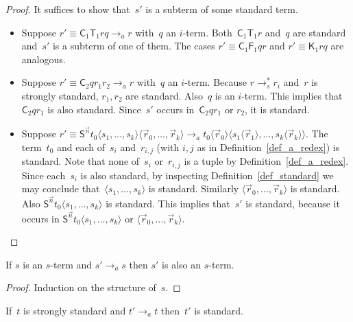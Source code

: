 \documentclass[a4paper,UKenglish]{lipics-v2016}
\newcommand{\Cs}{\mathsf{C}}
\newcommand{\Fs}{\mathsf{F}}
\newcommand{\Ts}{\mathsf{T}}
\newcommand{\Ss}{\mathsf{S}}
\newcommand{\Ks}{\mathsf{K}}
\newcommand{\la}{\ensuremath{\langle}}
\newcommand{\ra}{\ensuremath{\rangle}}
\begin{document}
\begin{proof}
  It suffices to show that~$s'$ is a subterm of some standard term.
  \begin{itemize}
  \item Suppose $r' \equiv \Cs_1 \Ts_1 r q \to_a r$ with~$q$ an
    $i$-term. Both~$\Cs_1 \Ts_1 r$ and~$q$ are standard and~$s'$ is a
    subterm of one of them. The cases $r' \equiv \Cs_1 \Fs_1 q r$ and
    $r' \equiv \Ks_1 r q$ are analogous.
  \item Suppose $r' \equiv \Cs_2 q r_1 r_2 \to_a r$ with~$q$ an
    $i$-term. Because $r \to_s^{*} r_i$ and~$r$ is strongly standard,
    $r_1,r_2$ are standard. Also~$q$ is an $i$-term. This implies that
    $\Cs_2 q r_1$ is also standard. Since~$s'$ occurs in~$\Cs_2 q r_1$ or
    $r_2$, it is standard.
  \item Suppose
    $r' \equiv \Ss^{\vec{n}} t_0 \la s_1,\ldots,s_k \ra \la
    \vec{r}_0,\ldots,\vec{r}_k \ra \to_a t_0 \la \vec{r}_0 \ra \la
    s_1 \la \vec{r}_1 \ra, \ldots, s_k \la \vec{r}_k \ra \ra$. The
    term~$t_0$ and each of~$s_i$ and~$r_{i,j}$ (with $i,j$ as in
    Definition~\ref{def_a_redex}) is standard. Note that none of~$s_i$
    or~$r_{i,j}$ is a tuple by Definition~\ref{def_a_redex}. Since
    each~$s_i$ is also standard, by inspecting
    Definition~\ref{def_standard} we may conclude
    that~$\la s_1,\ldots,s_k\ra$ is standard. Similarly
    $\la \vec{r}_0,\ldots,\vec{r}_k \ra$ is standard. Also
    $\Ss^{\vec{n}} t_0 \la s_1,\ldots,s_k \ra$ is standard. This
    implies that~$s'$ is standard, because it occurs in
    $\Ss^{\vec{n}} t_0 \la s_1,\ldots,s_k \ra$ or
    $\la \vec{r}_0,\ldots,\vec{r}_k \ra$.
  \end{itemize}
\end{proof}

\begin{lemma}\label{lem_a_preserves_s_term}
  If $s$ is an $s$-term and $s' \to_a s$ then $s'$ is also an
  $s$-term.
\end{lemma}

\begin{proof}
  Induction on the structure of~$s$.
\end{proof}

\begin{lemma}\label{lem_expand_a_std}
  If~$t$ is strongly standard and $t' \to_a t$ then~$t'$ is standard.
\end{lemma}
\end{document}
